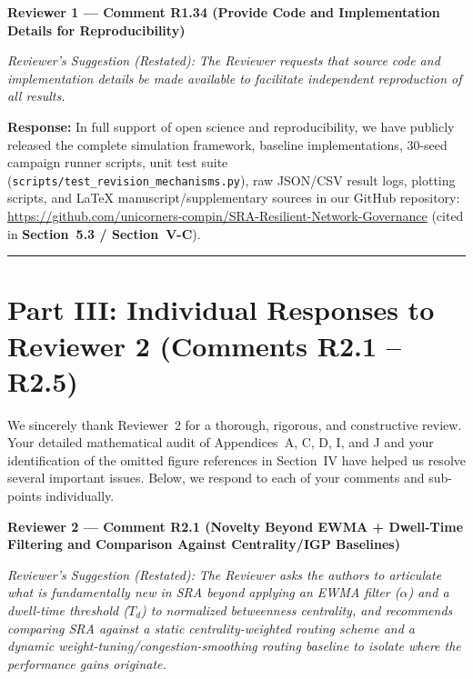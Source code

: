 \documentclass[11pt,a4paper]{article}
\newcommand{\cbox}[2]{%
  \vspace{0.6em}\noindent\textbf{#1}\par\smallskip
  \noindent\textit{Reviewer's Suggestion (Restated):} \textit{#2}\par\smallskip
}
\begin{document}
\hrulefill

\cbox{Reviewer 1 --- Comment R1.34 (Provide Code and Implementation Details for Reproducibility)}{The Reviewer requests that source code and implementation details be made available to facilitate independent reproduction of all results.}

\noindent\textbf{Response:} In full support of open science and reproducibility, we have publicly released the complete simulation framework, baseline implementations, 30-seed campaign runner scripts, unit test suite (\texttt{scripts/test\_revision\_mechanisms.py}), raw JSON/CSV result logs, plotting scripts, and \LaTeX{} manuscript/supplementary sources in our GitHub repository: \url{https://github.com/unicorners-compin/SRA-Resilient-Network-Governance} (cited in \textbf{Section~5.3 / Section~V-C}).

\vspace{0.5em}
\hrule
\section*{Part III: Individual Responses to Reviewer 2 (Comments R2.1 -- R2.5)}

We sincerely thank Reviewer~2 for a thorough, rigorous, and constructive review. Your detailed mathematical audit of Appendices~A, C, D, I, and J and your identification of the omitted figure references in Section~IV have helped us resolve several important issues. Below, we respond to each of your comments and sub-points individually.

\cbox{Reviewer 2 --- Comment R2.1 (Novelty Beyond EWMA + Dwell-Time Filtering and Comparison Against Centrality/IGP Baselines)}{The Reviewer asks the authors to articulate what is fundamentally new in SRA beyond applying an EWMA filter ($\alpha$) and a dwell-time threshold ($T_d$) to normalized betweenness centrality, and recommends comparing SRA against a static centrality-weighted routing scheme and a dynamic weight-tuning/congestion-smoothing routing baseline to isolate where the performance gains originate.}
\end{document}
